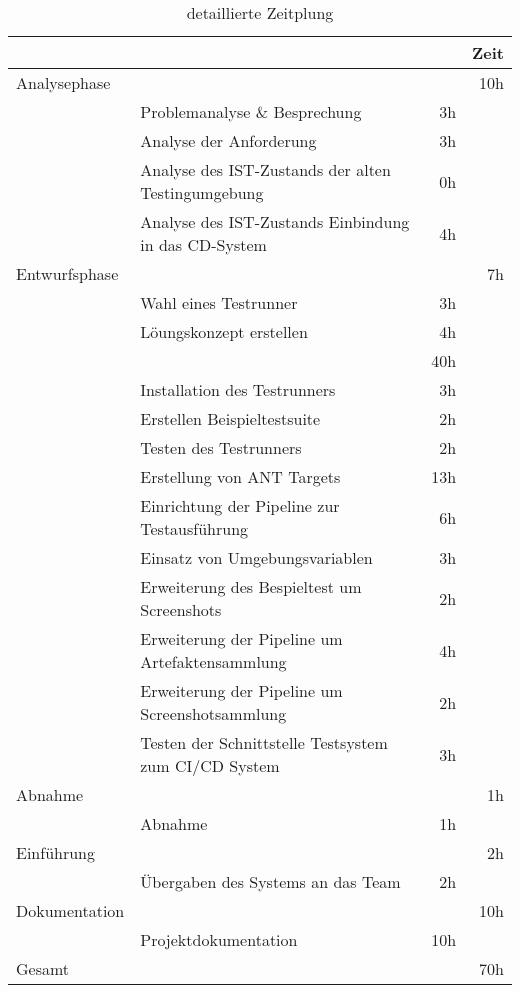 \begin{table}[h]
\begin{tabular}{llrr}
\rowcolor{gragreen}\multicolumn{1}{l}{\bf{Projektphase}} & \multicolumn{1}{l}{ } & \multicolumn{1}{l}{\bf{ }} & \multicolumn{1}{l}{\bf{Zeit}} \\
\hline
\rowcolor{heading}Analysephase &  &  & 10h \\
 & Problemanalyse \& Besprechung & 3h &  \\
\rowcolor{odd} & Analyse der Anforderung & 3h &  \\
& Analyse des IST-Zustands der alten Testingumgebung & 0h &  \\
 \rowcolor{odd}& Analyse des IST-Zustands Einbindung in das CD-System & 4h &  \\
\rowcolor{heading}Entwurfsphase &  &  & 7h \\
 & Wahl eines Testrunner & 3h &  \\
 \rowcolor{odd} & Löungskonzept erstellen & 4h &  \\
\rowcolor{heading}\multicolumn{2}{l}{Implementierungsphase}   &  & 40h \\
 & Installation des Testrunners & 3h &  \\
 \rowcolor{odd}& Erstellen Beispieltestsuite & 2h &  \\
 & Testen des Testrunners & 2h &  \\
\rowcolor{odd} & Erstellung von ANT Targets & 13h &  \\
 & Einrichtung der Pipeline zur Testausführung & 6h &  \\
\rowcolor{odd} & Einsatz von Umgebungsvariablen & 3h &  \\
 & Erweiterung des Bespieltest um Screenshots & 2h &  \\
\rowcolor{odd} & Erweiterung der Pipeline um Artefaktensammlung & 4h &  \\
 & Erweiterung der Pipeline um Screenshotsammlung & 2h &  \\
\rowcolor{odd} & Testen der Schnittstelle Testsystem zum CI/CD System & 3h &  \\
\rowcolor{heading}Abnahme &  &  & 1h \\
 & Abnahme & 1h &  \\
\rowcolor{heading}Einführung &  &  & 2h \\
 & Übergaben des Systems an das Team & 2h &  \\
\rowcolor{heading}Dokumentation &  &  & 10h \\
 & Projektdokumentation & 10h & \\
\hline
\rowcolor{heading}Gesamt &  &  & 70h
\end{tabular}
\caption{detaillierte Zeitplung}
\label{table:detailtimetable}
\end{table}